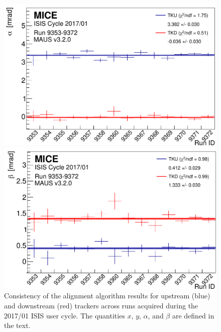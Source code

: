 \begin{figure}[htb]
\begin{center}
\begin{minipage}[b]{.45\textwidth}
\begin{center}
        \includegraphics[width=\textwidth]{data_final/alpha_bestfit-edit.pdf}
      \end{center}
    \end{minipage}
    \hfill
    \begin{minipage}[b]{.45\textwidth}
      \begin{center}
        \includegraphics[width=\textwidth]{data_final/beta_bestfit-edit.pdf}
      \end{center}
    \end{minipage}
  \end{center}
  \caption{
    Consistency of the alignment algorithm results for upstream (blue) and downstream (red) trackers  across runs acquired during
    the 2017/01 ISIS user cycle. The quantities $x$, $y$, $\alpha$, and $\beta$ are defined in the text.
  }
  \label{fig:runtorun}
\end{figure}
